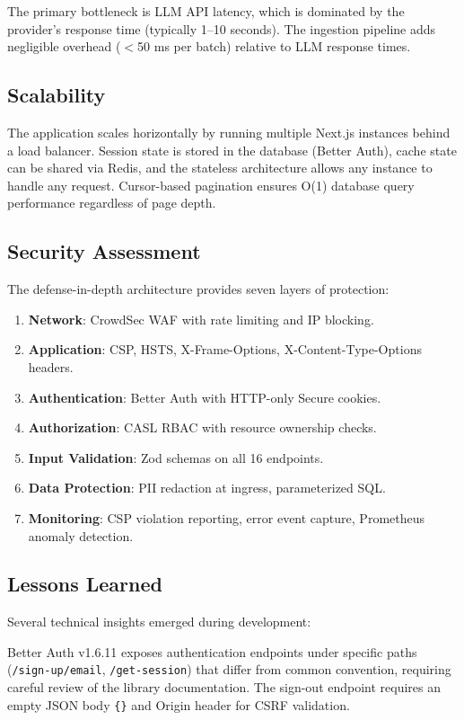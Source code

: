 \documentclass[conference]{IEEEtran}
\begin{document}
The primary bottleneck is LLM API latency, which is dominated by the provider's response time (typically 1--10 seconds). The ingestion pipeline adds negligible overhead ($<$50 ms per batch) relative to LLM response times.

\subsection{Scalability}

The application scales horizontally by running multiple Next.js instances behind a load balancer. Session state is stored in the database (Better Auth), cache state can be shared via Redis, and the stateless architecture allows any instance to handle any request. Cursor-based pagination ensures O(1) database query performance regardless of page depth.

\subsection{Security Assessment}

The defense-in-depth architecture provides seven layers of protection:

\begin{enumerate}
  \item \textbf{Network}: CrowdSec WAF with rate limiting and IP blocking.
  \item \textbf{Application}: CSP, HSTS, X-Frame-Options, X-Content-Type-Options headers.
  \item \textbf{Authentication}: Better Auth with HTTP-only Secure cookies.
  \item \textbf{Authorization}: CASL RBAC with resource ownership checks.
  \item \textbf{Input Validation}: Zod schemas on all 16 endpoints.
  \item \textbf{Data Protection}: PII redaction at ingress, parameterized SQL.
  \item \textbf{Monitoring}: CSP violation reporting, error event capture, Prometheus anomaly detection.
\end{enumerate}

\subsection{Lessons Learned}

Several technical insights emerged during development:

Better Auth v1.6.11 exposes authentication endpoints under specific paths (\texttt{/sign-up/email}, \texttt{/get-session}) that differ from common convention, requiring careful review of the library documentation. The sign-out endpoint requires an empty JSON body \texttt{\{\}} and Origin header for CSRF validation.
\end{document}
